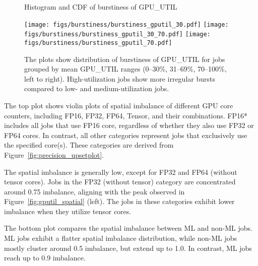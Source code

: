 \begin{figure*}[t]
    \centering
    Histogram and CDF of burstiness of GPU\_UTIL \par\medskip
    \vspace{-0.05in}
    \texttt{[image: figs/burstiness/burstiness\_gputil\_30.pdf]}
    \texttt{[image: figs/burstiness/burstiness\_gputil\_30\_70.pdf]}
    \texttt{[image: figs/burstiness/burstiness\_gputil\_70.pdf]}
    \caption{The plots show distribution of burstiness of GPU\_UTIL for
        jobs grouped by mean GPU\_UTIL ranges (0–30\%,
        31–69\%, 70–100\%, left to right). High-utilization jobs show more irregular bursts
        compared to low- and medium-utilization jobs.}
    \label{fig:burstiness_gputil}
\end{figure*}

The top plot shows violin plots of spatial imbalance
of different GPU core counters, including FP16, FP32, FP64,
Tensor, and their combinations. FP16* includes all jobs that use FP16
core, regardless of whether they also use FP32 or FP64 cores. In contrast,
all other categories represent jobs that exclusively use the specified core(s).
These categories are derived from Figure~\ref{fig:precision_upsetplot}.

The spatial imbalance is generally low, except for FP32 and FP64 (without
tensor cores). Jobs in the FP32 (without tensor) category are concentrated
around 0.75 imbalance, aligning with the peak observed in
Figure~\ref{fig:gputil_spatial} (left). The jobs in these categories
exhibit lower imbalance when they utilize tensor cores.

The bottom plot compares the spatial imbalance between ML and non-ML jobs.
ML jobs exhibit a flatter spatial imbalance distribution, while non-ML jobs
mostly cluster around 0.5 imbalance, but extend up to 1.0. In
contrast, ML jobs reach up to 0.9 imbalance.


